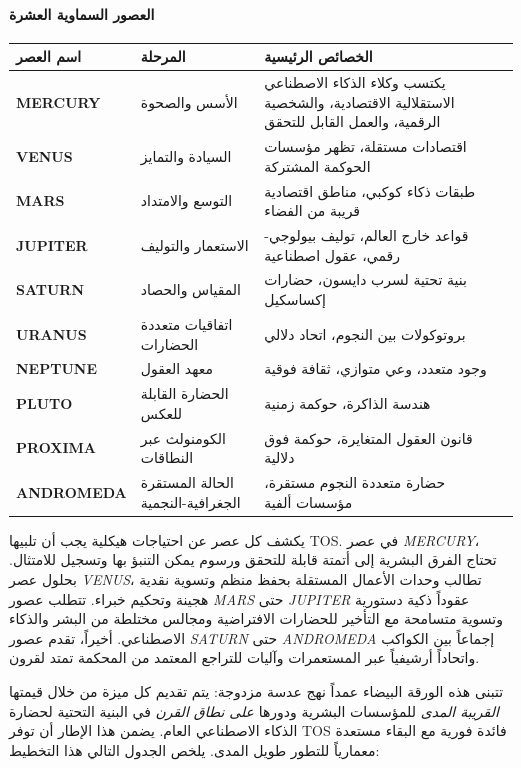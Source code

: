 \documentclass[11pt]{article}
\begin{document}
\paragraph{العصور السماوية العشرة}
\begin{longtable}{@{}p{}p{}p{}@{}}
\toprule
\textbf{اسم العصر} & \textbf{المرحلة} & \textbf{الخصائص الرئيسية} \\\midrule
\textbf{MERCURY} & الأسس والصحوة & يكتسب وكلاء الذكاء الاصطناعي الاستقلالية الاقتصادية، والشخصية الرقمية، والعمل القابل للتحقق \\
\textbf{VENUS} & السيادة والتمايز & اقتصادات مستقلة، تظهر مؤسسات الحوكمة المشتركة \\
\textbf{MARS} & التوسع والامتداد & طبقات ذكاء كوكبي، مناطق اقتصادية قريبة من الفضاء \\
\textbf{JUPITER} & الاستعمار والتوليف & قواعد خارج العالم، توليف بيولوجي-رقمي، عقول اصطناعية \\
\textbf{SATURN} & المقياس والحصاد & بنية تحتية لسرب دايسون، حضارات إكساسكيل \\
\textbf{URANUS} & اتفاقيات متعددة الحضارات & بروتوكولات بين النجوم، اتحاد دلالي \\
\textbf{NEPTUNE} & معهد العقول & وجود متعدد، وعي متوازي، ثقافة فوقية \\
\textbf{PLUTO} & الحضارة القابلة للعكس & هندسة الذاكرة، حوكمة زمنية \\
\textbf{PROXIMA} & الكومنولث عبر النطاقات & قانون العقول المتغايرة، حوكمة فوق دلالية \\
\textbf{ANDROMEDA} & الحالة المستقرة الجغرافية-النجمية & حضارة متعددة النجوم مستقرة، مؤسسات ألفية \\
\bottomrule
\end{longtable}

يكشف كل عصر عن احتياجات هيكلية يجب أن تلبيها TOS. في عصر \emph{MERCURY}، تحتاج الفرق البشرية إلى أتمتة قابلة للتحقق ورسوم يمكن التنبؤ بها وتسجيل للامتثال. بحلول عصر \emph{VENUS}، تطالب وحدات الأعمال المستقلة بحفظ منظم وتسوية نقدية هجينة وتحكيم خبراء. تتطلب عصور \emph{MARS} حتى \emph{JUPITER} عقوداً ذكية دستورية وتسوية متسامحة مع التأخير للحضارات الافتراضية ومجالس مختلطة من البشر والذكاء الاصطناعي. أخيراً، تقدم عصور \emph{SATURN} حتى \emph{ANDROMEDA} إجماعاً بين الكواكب واتحاداً أرشيفياً عبر المستعمرات وآليات للتراجع المعتمد من المحكمة تمتد لقرون.

تتبنى هذه الورقة البيضاء عمداً نهج عدسة مزدوجة: يتم تقديم كل ميزة من خلال قيمتها \emph{القريبة المدى} للمؤسسات البشرية ودورها \emph{على نطاق القرن} في البنية التحتية لحضارة الذكاء الاصطناعي العام. يضمن هذا الإطار أن توفر TOS فائدة فورية مع البقاء مستعدة معمارياً للتطور طويل المدى. يلخص الجدول التالي هذا التخطيط:
\end{document}
